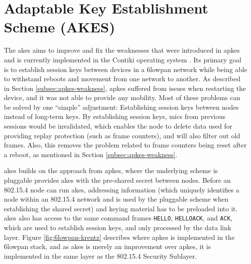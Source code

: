 \section{Adaptable Key Establishment Scheme (AKES)}

The \gls{akes} aims to improve and fix the weaknesses that were introduced in \gls{apkes} and is currently implemented in the Contiki operating system \cite{krentz2015handling}. Its primary goal is to establish session keys between devices in a \gls{6lowpan} network while being able to withstand reboots and movement from one network to another. As described in Section \ref{subsec:apkes-weakness}, \gls{apkes} suffered from issues when restarting the device, and it was not able to provide any mobility. Most of these problems can be solved by one ``simple'' adjustment: Establishing session keys between nodes instead of long-term keys. By establishing session keys, \gls{mic}s from previous sessions would be invalidated, which enables the node to delete data used for providing replay protection (such as frame counters), and will also filter out old frames. Also, this removes the problem related to frame counters being reset after a reboot, as mentioned in Section \ref{subsec:apkes-weakness}. 

\gls{akes} builds on the approach from \gls{apkes}, where the underlying scheme is pluggable provides \gls{akes} with the pre-shared secret between nodes. Before an 802.15.4 node can run \gls{akes}, addressing information (which uniquely identifies a node within an 802.15.4 network and is used by the pluggable scheme when establishing the shared secret) and keying material has to be preloaded into it. \gls{akes} also has access to the same command frames \texttt{HELLO}, \texttt{HELLOACK}, and \texttt{ACK}, which are used to establish session keys, and only processed by the data link layer. Figure \ref{fig:6lowpan-krentz} describes where \gls{apkes} is implemented in the \gls{6lowpan} stack, and as \gls{akes} is merely an improvement over \gls{apkes}, it is implemented in the same layer as the 802.15.4 Security Sublayer. 

